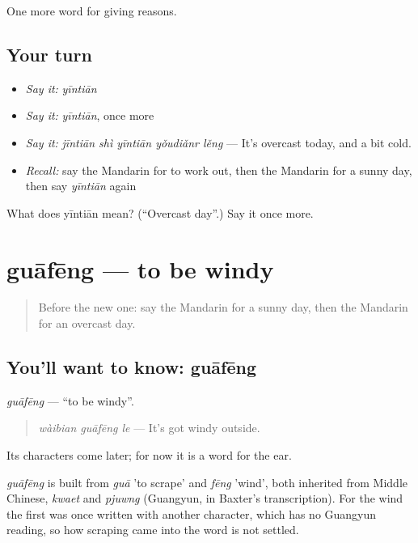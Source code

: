 \begin{grammarlens}[title={What you've built}]
One more word for giving reasons.
\end{grammarlens}

\subsection*{Your turn}
\begin{itemize}
\raggedright
  \item \emph{Say it:} \emph{yīntiān}
  \item \emph{Say it:} \emph{yīntiān}, once more
  \item \emph{Say it:} \emph{jīntiān shì yīntiān yǒudiǎnr lěng} — It's overcast today, and a bit cold.
  \item \emph{Recall:} say the Mandarin for to work out, then the Mandarin for a sunny day, then say \emph{yīntiān} again
\end{itemize}

\begin{tcolorbox}[breakable,colback=teal!4,colframe=teal!35!black,title={Before you move on}]
What does yīntiān mean? (\textquotedblleft{}Overcast day\textquotedblright{}.) Say it once more.
\end{tcolorbox}
\section[guāfēng]{guāfēng — to be windy}

\label{lesson:ZH-C136-guafeng}



\begin{quote}
Before the new one: say the Mandarin for a sunny day, then the Mandarin for an overcast day.
\end{quote}

\subsection*{You'll want to know: guāfēng}
\emph{guāfēng} — \textquotedblleft{}to be windy\textquotedblright{}.

\begin{quote}
\emph{wàibian guāfēng le} — It's got windy outside.
\end{quote}

Its characters come later; for now it is a word for the ear.

\begin{cousinweb}
\emph{guāfēng} is built from \emph{guā} 'to scrape' and \emph{fēng} 'wind', both inherited from Middle Chinese, \emph{kwaet} and \emph{pjuwng} (Guangyun, in Baxter's transcription). For the wind the first was once written with another character, which has no Guangyun reading, so how scraping came into the word is not settled.
\end{cousinweb}

